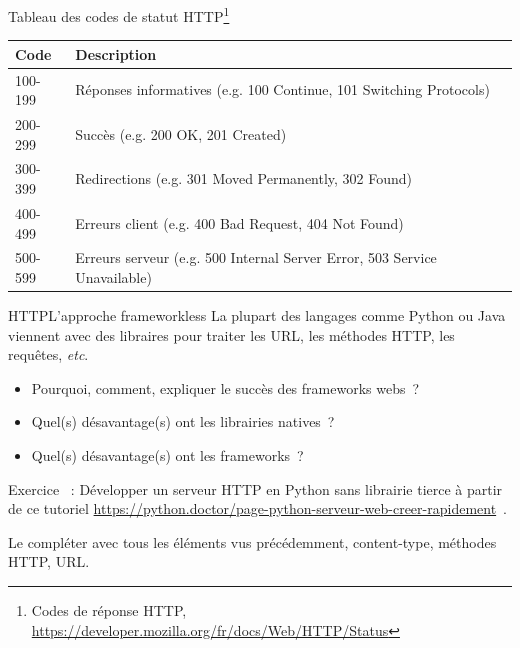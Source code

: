 \documentclass{beamer}
\begin{document}
    \begin{frame}{Tableau des codes de statut HTTP\footnote{Codes de réponse HTTP, \url{https://developer.mozilla.org/fr/docs/Web/HTTP/Status}}}
        \begin{tabular}{|p{1.5cm}|p{9.5cm}|}
            \hline
            \textbf{Code} & \textbf{Description}                                                      \\
            \hline
            100-199       & Réponses informatives (e.g. 100 Continue, 101 Switching Protocols)        \\
            \hline
            200-299       & Succès (e.g. 200 OK, 201 Created)                                         \\
            \hline
            300-399       & Redirections (e.g. 301 Moved Permanently, 302 Found)                      \\
            \hline
            400-499       & Erreurs client (e.g. 400 Bad Request, 404 Not Found)                      \\
            \hline
            500-599       & Erreurs serveur (e.g. 500 Internal Server Error, 503 Service Unavailable) \\
            \hline
        \end{tabular}
    \end{frame}


    \begin{frame}{HTTP}{L'approche frameworkless}
        La plupart des langages comme Python ou Java viennent avec des libraires pour traiter les URL, les méthodes HTTP, les requêtes, \textit{etc}.
        \bigbreak
        \begin{itemize}
            \item Pourquoi, comment, expliquer le succès des frameworks webs~?
            \item  Quel(s) désavantage(s) ont les librairies natives~?
            \item  Quel(s) désavantage(s) ont les frameworks~?
        \end{itemize}
        \bigbreak
        Exercice \execcounterdispinc~: Développer un serveur HTTP en Python sans librairie tierce à partir de ce tutoriel \url{https://python.doctor/page-python-serveur-web-creer-rapidement}~.

        Le compléter avec tous les éléments vus précédemment, content-type, méthodes HTTP, URL.
    \end{frame}
\end{document}
